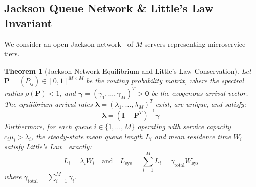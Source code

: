 \documentclass[letterpaper,twocolumn,10pt]{article}
\newtheorem{theorem}{Theorem}
\begin{document}
\subsection{Jackson Queue Network \& Little's Law Invariant}
We consider an open Jackson network~\cite{jackson1957networks} of $M$ servers representing microservice tiers.

\begin{theorem}[Jackson Network Equilibrium and Little's Law Conservation]
\label{thm:jackson_littles}
Let $\mathbf{P} = (P_{ij}) \in [0, 1]^{M \times M}$ be the routing probability matrix, where the spectral radius $\rho(\mathbf{P}) < 1$, and $\boldsymbol{\gamma} = (\gamma_1, \dots, \gamma_M)^T > \mathbf{0}$ be the exogenous arrival vector. The equilibrium arrival rates $\boldsymbol{\lambda} = (\lambda_1, \dots, \lambda_M)^T$ exist, are unique, and satisfy:
\begin{equation}
\boldsymbol{\lambda} = (\mathbf{I} - \mathbf{P}^T)^{-1} \boldsymbol{\gamma}
\end{equation}
Furthermore, for each queue $i \in \{1, \dots, M\}$ operating with service capacity $c_i \mu_i > \lambda_i$, the steady-state mean queue length $L_i$ and mean residence time $W_i$ satisfy Little's Law~\cite{little1961proof} exactly:
\begin{equation}
L_i = \lambda_i W_i \quad \text{and} \quad L_{\text{sys}} = \sum_{i=1}^M L_i = \gamma_{\text{total}} W_{\text{sys}}
\end{equation}
where $\gamma_{\text{total}} = \sum_{i=1}^M \gamma_i$.
\end{theorem}
\end{document}
